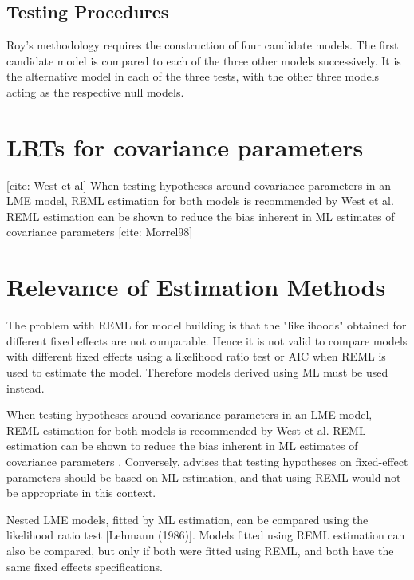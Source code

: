 \documentclass[12pt, a4paper]{report}
\theoremstyle{plain}
\theoremstyle{definition}
\theoremstyle{remark}
\begin{document}
\subsection{Testing Procedures}
Roy's methodology requires the construction of four candidate models. The first candidate model is compared to each of the three other models successively. It is the
alternative model in each of the three tests, with the other three models acting as the
respective null models.



\section{LRTs for covariance parameters}
[cite: West et al] When testing hypotheses around covariance parameters in an LME model, REML estimation for both models is recommended by West et al. REML estimation can be shown to reduce the bias inherent in ML estimates of covariance parameters [cite: Morrel98]

\section{Relevance of Estimation Methods}

The problem with REML for model building is that the "likelihoods" obtained for different fixed effects are not comparable. Hence it is not valid to compare models with different fixed effects using a likelihood ratio test or AIC when REML is used to estimate the model. Therefore models derived using ML must be used instead.

When testing hypotheses around covariance parameters in an LME model, REML estimation for both models is recommended by West et al. REML estimation can be shown to reduce the bias inherent in ML estimates of covariance parameters \citep{west}. Conversely, \citet{pb} advises that testing hypotheses on fixed-effect parameters should be based on ML estimation, and that using REML would not be appropriate in this context.

Nested LME models, fitted by ML estimation, can be compared using the likelihood ratio test [Lehmann (1986)].
Models fitted using REML estimation can also be compared, but only if both were fitted using REML, and both have the same fixed effects specifications.
\end{document}
